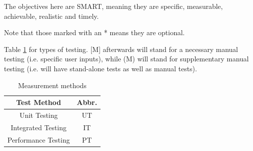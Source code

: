 \documentclass[10pt]{article}
\begin{document}
The objectives here are SMART, meaning they are specific, measurable, achievable, realistic and timely.

Note that those marked with an * means they are optional.

Table \ref{table:abbrs} for types of testing. [M] afterwards will stand for a necessary manual testing (i.e. specific user inputs), while (M) will stand for supplementary manual testing (i.e. will have stand-alone tests as well as manual tests).

\begin{table}[!ht]
    \centering
    \begin{tabular}{|c|c|}
        \hline
        Test Method         & Abbr. \\
        \hline
        Unit Testing        & UT    \\
        Integrated Testing  & IT    \\
        Performance Testing & PT    \\
        \hline
    \end{tabular}
    \caption{Measurement methods}
    \label{table:abbrs}
\end{table}
\end{document}
